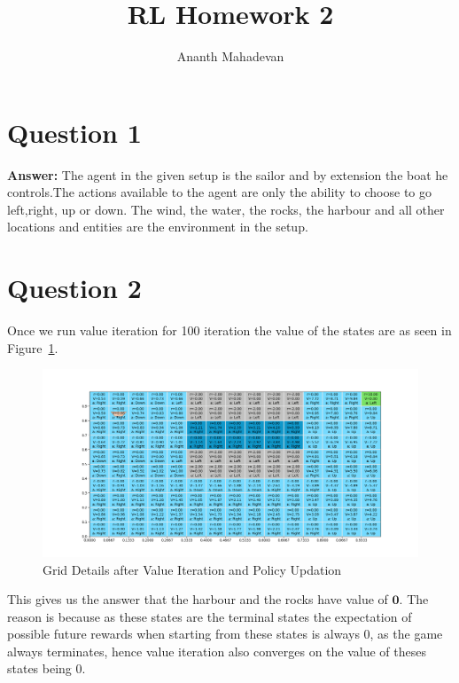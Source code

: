 \documentclass[a4paper]{article}
\title{RL Homework 2}
\author{Ananth Mahadevan}
\begin{document}
\maketitle
\clearpage
\tableofcontents
\clearpage

\section{Question 1}
\textbf{Answer:} The agent in the given setup is the sailor and by extension the boat he controls.The actions available  to the agent are only the ability to choose to go left,right, up or down. The wind, the water, the rocks, the harbour and all other locations and entities are the environment in the setup. 
\section{Question 2}
Once we run value iteration for 100 iteration the value of the states are as seen in Figure~\ref{fig-sailor}.
\begin{figure}[ht!]
    \centering
    \includegraphics[width=\textwidth]{Sailor.png}
    \caption{Grid Details after Value Iteration and Policy Updation}
    \label{fig-sailor}
\end{figure}
This gives us the answer that the harbour and the rocks have value of $\mathbf{0}$. The reason is because as these states are the terminal states the expectation of possible future rewards when starting from these states is always 0, as the game always terminates, hence value iteration also converges on the value of theses states being 0.
\end{document}
